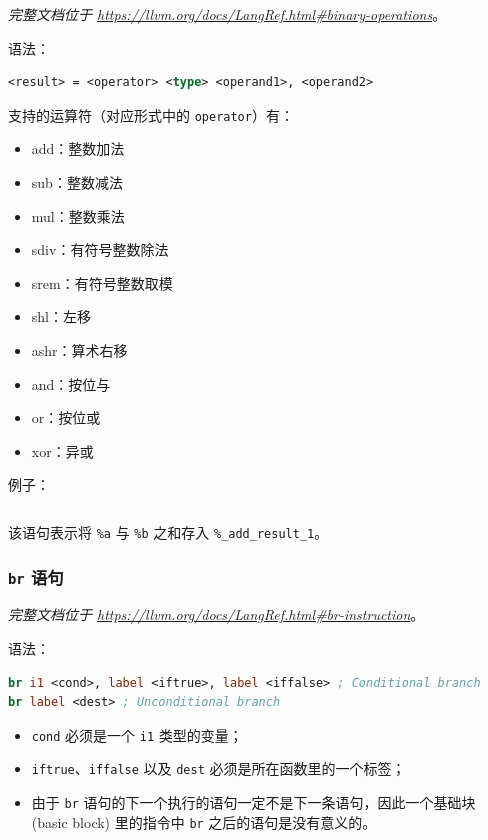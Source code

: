 \textit{完整文档位于 \url{https://llvm.org/docs/LangRef.html\#binary-operations}}。

语法：
\begin{lstlisting}[language=llvm]
<result> = <operator> <type> <operand1>, <operand2>
\end{lstlisting}

支持的运算符（对应形式中的 \texttt{operator}）有：
\begin{itemize}
  \item add：整数加法
  \item sub：整数减法
  \item mul：整数乘法
  \item sdiv：有符号整数除法
  \item srem：有符号整数取模
  \item shl：左移
  \item ashr：算术右移
  \item and：按位与
  \item or：按位或
  \item xor：异或
\end{itemize}

例子：
\begin{lstlisting}[language=llvm]
%_add_result_1 = add i32 %a, %b
\end{lstlisting}

该语句表示将 \texttt{\%a} 与 \texttt{\%b} 之和存入 \texttt{\%\_add\_result\_1}。

\subsubsection{\texttt{br} 语句}\label{LLVM-br-statements}

\textit{完整文档位于 \url{https://llvm.org/docs/LangRef.html\#br-instruction}}。

语法：
\begin{lstlisting}[language=llvm]
br i1 <cond>, label <iftrue>, label <iffalse> ; Conditional branch
br label <dest> ; Unconditional branch
\end{lstlisting}

\begin{itemize}
  \item \texttt{cond} 必须是一个 \texttt{i1} 类型的变量；
  \item \texttt{iftrue}、\texttt{iffalse} 以及 \texttt{dest}
    必须是所在函数里的一个标签；
  \item 由于 \texttt{br} 语句的下一个执行的语句一定不是下一条语句，因此一个基础块
    (basic block) 里的指令中 \texttt{br} 之后的语句是没有意义的。
\end{itemize}

